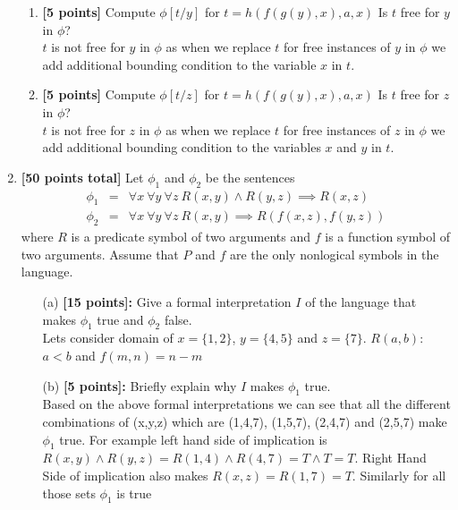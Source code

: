 \documentclass{article}
\begin{document}
\begin{enumerate}
\begin{enumerate}
  \item \textbf{[5 points]} Compute $\phi[t/y]$ for
    $t = h(f(g(y),x),a,x)$ Is $t$ free for $y$ in $\phi$?\\
    $t$ is not free for $y$ in $\phi$ as when we replace $t$ for free
    	instances of $y$ in $\phi$ we add additional bounding condition to the
    	variable $x$ in $t$.

  \item \textbf{[5 points]} Compute $\phi[t/z]$ for
    $t = h(f(g(y),x),a,x)$ Is $t$ free for $z$ in $\phi$?\\
    $t$ is not free for $z$ in $\phi$ as when we replace $t$ for free
    	instances of $z$ in $\phi$ we add additional bounding condition to the
    	variables $x$ and $y$ in $t$.

  \end{enumerate}
  
\item \textbf{[50 points total]} Let $\phi_1$ and $\phi_2$ be the
  sentences
  \begin{eqnarray*}
    \phi_1 
    & =
    & \forall x\ \forall y\ \forall z\
      R(x,y) \land R(y,z) \implies R(x,z) 
    \\
    \phi_2
    & = 
    & \forall x\ \forall y\ \forall z\
      R(x,y) \implies R(f(x,z),f(y,z))
  \end{eqnarray*}
  where $R$ is a predicate symbol of two arguments and $f$ is a
  function symbol of two arguments.  Assume that $P$ and $f$ are the
  only nonlogical symbols in the language.

  \begin{itemize}

  \item[(a)] \textbf{[15 points]:} Give a formal interpretation $I$ of
    the language that makes $\phi_1$ true and $\phi_2$ false.\\
    Lets consider domain of $x=\{1,2\}$, $y=\{4,5\}$ and $z=\{7\}$. $R(a,b)$: $a < b$ and $f(m,n)=n-m$

  \item[(b)] \textbf{[5 points]:} Briefly explain why $I$ makes
    $\phi_1$ true.\\
    Based on the above formal interpretations we can see that all the different combinations of (x,y,z) which are (1,4,7), (1,5,7), (2,4,7) and (2,5,7) make  $\phi_1$ true. For example left hand side of implication is $R(x,y) \land R(y,z) = R(1,4) \land R(4,7) = T \land T = T$. Right Hand Side of implication also makes $R(x,z)=R(1,7) = T$. Similarly for all those sets $\phi_1$ is true


\end{itemize}
\end{enumerate}
\end{document}
